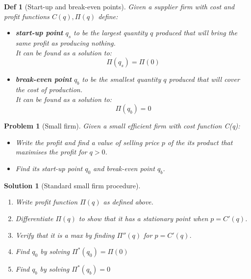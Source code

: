 \documentclass[11pt,a4paper, margin]{article}
\theoremstyle{break}
\newtheorem*{problem}{Problem}
\theoremstyle{break}
\newtheorem*{solution}{Solution}
\newtheorem*{definition}{Def}
\begin{document}
\begin{definition} [Start-up and break-even points]

Given a supplier firm with cost and profit functions $C(q), \Pi(q)$ define:

\begin{itemize}
	\item \textbf{start-up point} $q_s$ to be the largest quantity $q$ produced that will bring the same profit as producing nothing. \\It can be found as a solution to:
\[\Pi(q_s) = \Pi(0)\]
	\item \textbf{break-even point} $q_b$ to be the smallest quantity $q$ produced that will cover the cost of production. \\It can be found as a solution to:
\[\Pi(q_b) = 0\]
\end{itemize} 
\end{definition}

\begin{problem} [Small firm]
Given a small efficient firm with cost function C(q):
\begin{itemize}
	\item Write the profit and find a value of selling price $p$ of the its product that maximises the profit for $q>0$.
	\item Find its start-up point $q_0$ and break-even point $q_b$. 
\end{itemize}
\end{problem}

\begin{solution} [Standard small firm procedure]
\begin{enumerate}
	\item Write profit function $\Pi(q)$ as defined above.
	\item Differentiate $\Pi(q)$ to show that it has a stationary point when $p = C'(q)$.
	\item Verify that it is a max by finding $\Pi''(q)$ for $p = C'(q)$.
	\item Find $q_0$ by solving $\Pi^\ast(q_0) = \Pi(0)$
	\item Find $q_b$ by solving $\Pi^\ast(q_b) = 0$
\end{enumerate}
\end{solution}
\end{document}
